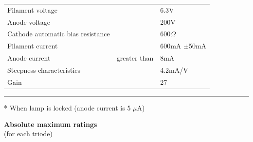 \documentclass[12pt]{article}
\makeatletter
\renewcommand \dotfill {\leavevmode \cleaders \hb@xt@ 5mm{\hss .\hss }\hfill \kern \z@}
\makeatother
\begin{document}
    \begin{tabular}{p{105mm}l@{}l}
        Filament voltage \hspace{-2.0mm} \dotfill & & 6.3V \\
        Anode voltage \hspace{-2.6mm} \dotfill & & 200V \\
        Cathode automatic bias resistance \hspace{-3.8mm} \dotfill & & 600$\Omega$ \\
        Filament current \hspace{-2.1mm} \dotfill & & 600mA $\pm$50mA \\
        Anode current \hspace{-2.6mm} \dotfill & \hspace{-7mm} greater than \hspace{1mm} & 8mA \\
        Steepness characteristics \hspace{-0.9mm} \dotfill & & 4.2mA/V \\
        Gain \hspace{-0.4mm} \dotfill & & 27 \\
    \end{tabular}
    
    \vspace{1mm}
    \hspace{-7mm} \rule{25mm}{0.5mm}
    
    * When lamp is locked (anode current is 5 $\mu$A)
    
    \newpage
    
    \noindent \textbf{Absolute maximum ratings} \\
    (for each triode)
    
    \vspace{3mm}
    
\end{document}
